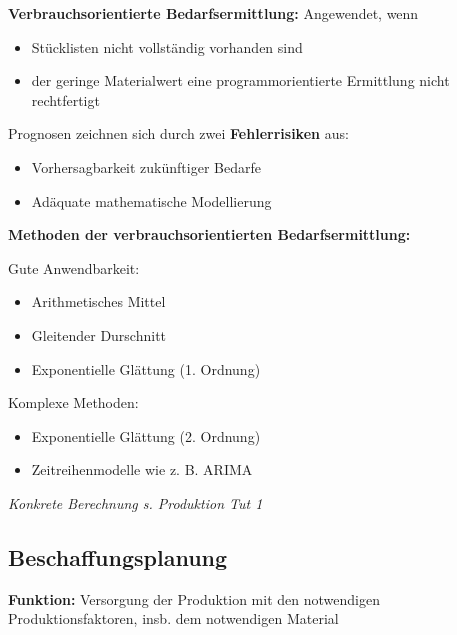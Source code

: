 \textbf{Verbrauchsorientierte Bedarfsermittlung:}
Angewendet, wenn
\begin{itemize}
	\item Stücklisten nicht vollständig vorhanden sind
	\item der geringe Materialwert eine programmorientierte Ermittlung nicht rechtfertigt
\end{itemize}

Prognosen zeichnen sich durch zwei \textbf{Fehlerrisiken} aus: 
\begin{itemize}
	\item Vorhersagbarkeit zukünftiger Bedarfe
	\item Adäquate mathematische Modellierung
\end{itemize}
\bigskip
\textbf{Methoden der verbrauchsorientierten Bedarfsermittlung:}

Gute Anwendbarkeit:
\begin{itemize}
	\item Arithmetisches Mittel
	\item Gleitender Durschnitt
	\item Exponentielle Glättung (1. Ordnung)
\end{itemize}
Komplexe Methoden:
\begin{itemize}
	\item Exponentielle Glättung (2. Ordnung)
	\item Zeitreihenmodelle wie z. B. ARIMA
\end{itemize}
\textit{Konkrete Berechnung s. Produktion Tut 1}

\subsection{Beschaffungsplanung}
\textbf{Funktion:} Versorgung der Produktion mit den notwendigen Produktionsfaktoren, insb. dem notwendigen Material

